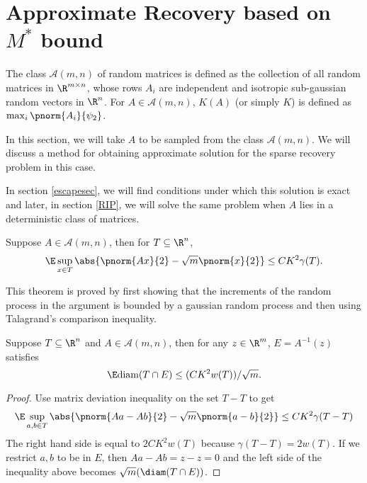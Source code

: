 \section{Approximate Recovery based on $M^*$ bound}
\begin{definition}
	The class $\mathcal{A}(m, n)$ of random matrices is defined
	as the collection of all random matrices in $\R^{m\times n}$,
	whose rows $A_i$ are independent and isotropic
	sub-gaussian random vectors in $\R^n$. For $A\in\mathcal{A}(m,n)$,
	$K(A)$ (or simply $K$) is defined as $\max_i \pnorm{A_i}{\psi_2}$.
\end{definition}
In this section, we will take $A$ to be sampled from the
class $\mathcal{A}(m, n)$. We will discuss a method for obtaining
approximate solution for the sparse recovery problem in this case.

In section \ref{escapesec}, we will find conditions under which
this solution is exact and
later,
in section \ref{RIP}, we will solve the same problem when $A$ lies in
a deterministic class of matrices.
\begin{theorem}
	Suppose $A\in\mathcal{A}(m, n)$, then for $T\subseteq \R^n$,
	\begin{equation}\label{matrixdeviation}
		\E \sup_{x\in T} \abs{\pnorm{Ax}{2}-\sqrt{m}\pnorm{x}{2}}
			\leq CK^2\gamma(T).
	\end{equation}
\end{theorem}
This theorem is proved by first showing that the increments of
the random process in the argument is bounded by a gaussian
random process and then using Talagrand's comparison inequality\cite{hdp}.
\begin{theorem}[$M^*$ bound]\label{mstarboundtheorem}
	Suppose $T\subseteq \R^n$ and $A\in\mathcal{A}(m, n)$,
	then for any $z\in\R^m$, $E = A^{-1}(z)$ satisfies
	\begin{equation}\label{mstarbound}
		\E \text{diam}(T\cap E)\leq ({CK^2w(T)})/{\sqrt{m}}.
	\end{equation}
\end{theorem}
\begin{proof}
	Use matrix deviation inequality on the set $T-T$ to get
	$$\E\sup_{a,b\in T}\abs{\pnorm{Aa-Ab}{2}-\sqrt{m}\pnorm{a-b}{2}}\leq CK^2\gamma(T-T)$$
	The right hand side is equal to $2CK^2 w(T)$ because $\gamma(T-T) = 2w(T)$.
	If we restrict $a, b$ to be in $E$, then $Aa-Ab = z-z= 0$ and the left side of the 
	inequality above becomes $\sqrt{m}(\diam({T\cap E}))$.
\end{proof}

